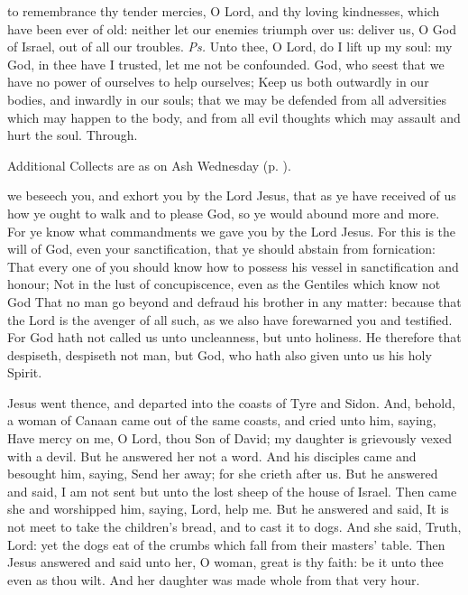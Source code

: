 \introit
{} to remembrance thy tender mercies, O Lord, and thy loving kindnesses, which have been ever of old: neither let our enemies triumph over us: deliver us, O God of Israel, out of all our troubles. \textit{Ps.} Unto thee, O Lord, do I lift up my soul: my God, in thee have I trusted, let me not be confounded.
\collect
{} God, who seest that we have no power of ourselves to help ourselves; Keep us both outwardly in our bodies, and inwardly in our souls; that we may be defended from all adversities which may happen to the body, and from all evil thoughts which may assault and hurt the soul. Through.
\begin{rubric}
    Additional Collects are as on Ash Wednesday (p. \pageref{AshWednesdayMassCollect}).
\end{rubric}
 we beseech you, and exhort you by the Lord Jesus, that as ye have received of us how ye ought to walk and to please God, so ye would abound more and more. For ye know what commandments we gave you by the Lord Jesus. For this is the will of God, even your sanctification, that ye should abstain from fornication: That every one of you should know how to possess his vessel in sanctification and honour; Not in the lust of concupiscence, even as the Gentiles which know not God That no man go beyond and defraud his brother in any matter: because that the Lord is the avenger of all such, as we also have forewarned you and testified. For God hath not called us unto uncleanness, but unto holiness. He therefore that despiseth, despiseth not man, but God, who hath also given unto us his holy Spirit.


 Jesus went thence, and departed into the coasts of Tyre and Sidon. And, behold, a woman of Canaan came out of the same coasts, and cried unto him, saying, Have mercy on me, O Lord, thou Son of David; my daughter is grievously vexed with a devil. But he answered her not a word. And his disciples came and besought him, saying, Send her away; for she crieth after us. But he answered and said, I am not sent but unto the lost sheep of the house of Israel. Then came she and worshipped him, saying, Lord, help me. But he answered and said, It is not meet to take the children's bread, and to cast it to dogs. And she said, Truth, Lord: yet the dogs eat of the crumbs which fall from their masters' table. Then Jesus answered and said unto her, O woman, great is thy faith: be it unto thee even as thou wilt. And her daughter was made whole from that very hour.

